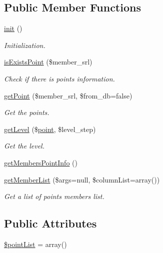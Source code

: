 \subsection*{Public Member Functions}
\begin{DoxyCompactItemize}
\item 
\hyperlink{classpointModel_add66679251115fa4592f15398f3efc62}{init} ()
\begin{DoxyCompactList}\small\item\em Initialization. \end{DoxyCompactList}\item 
\hyperlink{classpointModel_a9e143b8c0eb599eebcce662a70a1dbd9}{is\+Exists\+Point} (\$member\+\_\+srl)
\begin{DoxyCompactList}\small\item\em Check if there is points information. \end{DoxyCompactList}\item 
\hyperlink{classpointModel_ac3d92531cca94dd31fde8f6b86a855fc}{get\+Point} (\$member\+\_\+srl, \$from\+\_\+db=false)
\begin{DoxyCompactList}\small\item\em Get the points. \end{DoxyCompactList}\item 
\hyperlink{classpointModel_aaada8e8cba6e965f06c2b25e4974537c}{get\+Level} (\$\hyperlink{classpoint}{point}, \$level\+\_\+step)
\begin{DoxyCompactList}\small\item\em Get the level. \end{DoxyCompactList}\item 
\hyperlink{classpointModel_a87117e204a484410442a54ee56332836}{get\+Members\+Point\+Info} ()
\item 
\hyperlink{classpointModel_ab3b968a740e10f9039da99adae67dcb7}{get\+Member\+List} (\$args=null, \$column\+List=array())
\begin{DoxyCompactList}\small\item\em Get a list of points members list. \end{DoxyCompactList}\end{DoxyCompactItemize}
\subsection*{Public Attributes}
\begin{DoxyCompactItemize}
\item 
\hyperlink{classpointModel_a4aec7fcf0df721c0046d2b9a9380f0ae}{\$point\+List} = array()
\end{DoxyCompactItemize}


